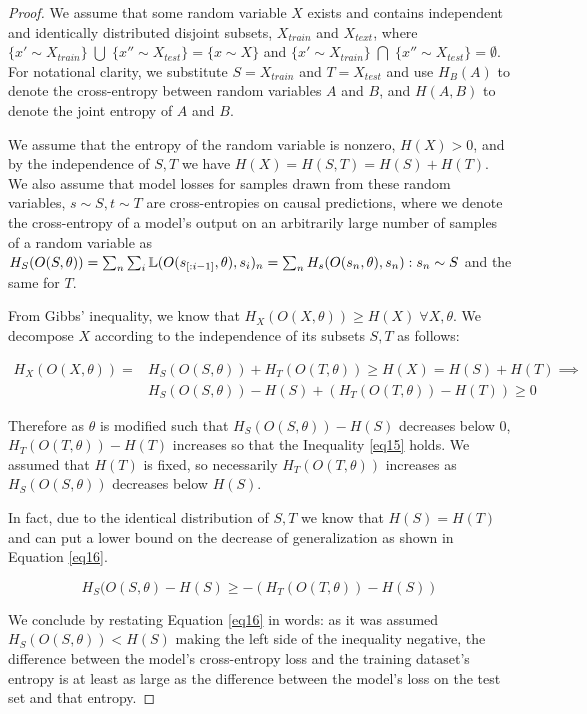 \documentclass{article}
\begin{document}
    \begin{proof}

    We assume that some random variable $X$ exists and contains independent and identically distributed disjoint subsets, $X_{train}$ and $X_{text}$, where $\{x' \sim X_{train}\} \; \bigcup \; \{x'' \sim X_{test}\} = \{x \sim X\}$ and $\{x' \sim X_{train}\} \; \bigcap \; \{x'' \sim X_{test}\} = \emptyset$. For notational clarity, we substitute $S = X_{train}$ and $T = X_{test}$ and use $H_B(A)$ to denote the cross-entropy between random variables $A$ and $B$, and $H(A, B)$ to denote the joint entropy of $A$ and $B$. 
    
    We assume that the entropy of the random variable is nonzero, $H(X) > 0$, and by the independence of $S, T$ we have $H(X) = H(S, T) = H(S) + H(T)$.  We also assume that model losses for samples drawn from these random variables, $s \sim S, t \sim T$ are cross-entropies on causal predictions, where we denote the cross-entropy of a model's output on an arbitrarily large number of samples of a random variable as $H_S(O(S, \theta)) = \sum_n \sum_i\Bbb L(O(s_{[:i-1]}, \theta), s_i)_n = \sum_n H_s(O(s_n, \theta), s_n) :  s_n \sim S$ and the same for $T$.

    From Gibbs' inequality, we know that $H_X(O(X, \theta)) \geq H(X) \; \forall  X, \theta$. We decompose $X$ according to the independence of its subsets $S, T$ as follows:
    
    \begin{equation}
        \begin{split}
         H_X(O(X, \theta)) = & H_S(O(S, \theta)) + H_T(O(T, \theta)) \geq H(X) = H(S) + H(T) \implies \\
         & H_S(O(S, \theta)) - H(S) + \left( H_T(O(T, \theta)) - H(T)  \right) \geq 0 
         \end{split}
         \label{eq15}
    \end{equation}

    Therefore as $\theta$ is modified such that $H_S(O(S, \theta)) - H(S)$ decreases below $0$, $H_T(O(T, \theta)) - H(T)$ increases so that the Inequality \ref{eq15} holds. We assumed that $H(T)$ is fixed, so necessarily $H_T(O(T, \theta))$ increases as $H_S(O(S, \theta))$ decreases below $H(S)$. 
    
    In fact, due to the identical distribution of $S, T$ we know that $H(S) = H(T)$ and can put a lower bound on the decrease of generalization as shown in Equation \ref{eq16}.

    \begin{equation}
        H_S(O(S, \theta) - H(S) \geq - \left( H_T(O(T, \theta)) - H(S) \right)
        \label{eq16}
    \end{equation}
    
    We conclude by restating Equation \ref{eq16} in words: as it was assumed $H_S(O(S, \theta)) < H(S)$ making the left side of the inequality negative, the difference between the model's cross-entropy loss and the training dataset's entropy is at least as large as the difference between the model's loss on the test set and that entropy.
    
    \end{proof}
\end{document}
